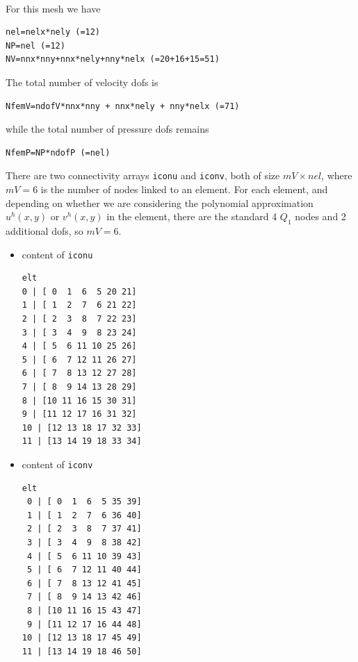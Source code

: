 \begin{center}
\\
\end{center}

For this mesh we have 

\begin{lstlisting}
nel=nelx*nely (=12) 
NP=nel (=12)
NV=nnx*nny+nnx*nely+nny*nelx (=20+16+15=51)
\end{lstlisting}

The total number of velocity dofs is 
\begin{lstlisting}
NfemV=ndofV*nnx*nny + nnx*nely + nny*nelx (=71)
\end{lstlisting}
while the total number of pressure dofs remains
\begin{lstlisting}
NfemP=NP*ndofP (=nel) 
\end{lstlisting}


There are two connectivity arrays {\tt iconu} and {\tt iconv}, both of size $mV\times nel$, where 
$mV=6$ is the number of nodes linked to an element. For each element, and depending on whether we are considering 
the polynomial approximation $u^h(x,y)$ or $v^h(x,y)$ in the element, there are the standard 4 $Q_1$ nodes and 2 additional 
dofs, so $mV=6$.
\begin{itemize}
\item content of {\tt iconu}
\begin{verbatim}
elt
0 | [ 0  1  6  5 20 21]
1 | [ 1  2  7  6 21 22]
2 | [ 2  3  8  7 22 23]
3 | [ 3  4  9  8 23 24]
4 | [ 5  6 11 10 25 26]
5 | [ 6  7 12 11 26 27]
6 | [ 7  8 13 12 27 28]
7 | [ 8  9 14 13 28 29]
8 | [10 11 16 15 30 31]
9 | [11 12 17 16 31 32]
10 | [12 13 18 17 32 33]
11 | [13 14 19 18 33 34]
\end{verbatim}
\item content of {\tt iconv}
\begin{verbatim}
elt
 0 | [ 0  1  6  5 35 39]
 1 | [ 1  2  7  6 36 40]
 2 | [ 2  3  8  7 37 41]
 3 | [ 3  4  9  8 38 42]
 4 | [ 5  6 11 10 39 43]
 5 | [ 6  7 12 11 40 44]
 6 | [ 7  8 13 12 41 45]
 7 | [ 8  9 14 13 42 46]
 8 | [10 11 16 15 43 47]
 9 | [11 12 17 16 44 48]
10 | [12 13 18 17 45 49]
11 | [13 14 19 18 46 50]
\end{verbatim}
\end{itemize}

